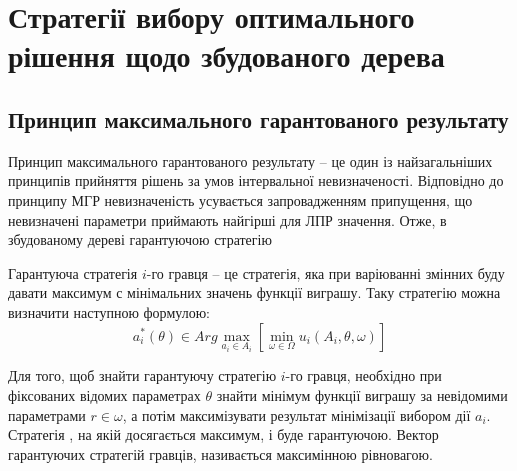 \chapter{Стратегії вибору оптимального рішення щодо збудованого дерева}
\section{Принцип максимального гарантованого результату}
Принцип максимального гарантованого результату – це один із
найзагальніших принципів прийняття рішень за умов інтервальної невизначеності. Відповідно до принципу МГР невизначеність усувається запровадженням припущення, що невизначені параметри приймають найгірші
для ЛПР значення. Отже, в збудованому дереві гарантуючою стратегію

Гарантуюча стратегія \(i\)-го гравця – це стратегія, яка при варіюванні змінних буду давати максимум с мінімальних значень функції виграшу. Таку стратегію можна визначити наступною формулою:
\begin{equation}
a_i^{*}(\theta)\in Arg \max_{{a_i\in A_i}}[\min_{{\omega\in \Omega}} u_i(A_i,\theta,\omega)]
\end{equation}

Для того, щоб знайти гарантуючу стратегію \(i\)-го гравця, необхідно
при фіксованих відомих параметрах \(\theta\) знайти мінімум функції виграшу за невідомими параметрами \(r \in \omega\), а потім максимізувати результат мінімізації вибором дії \(a_i\). Стратегія , на якій досягається максимум, і буде гарантуючою.
Вектор гарантуючих стратегій гравців, називається максимінною рівновагою.

